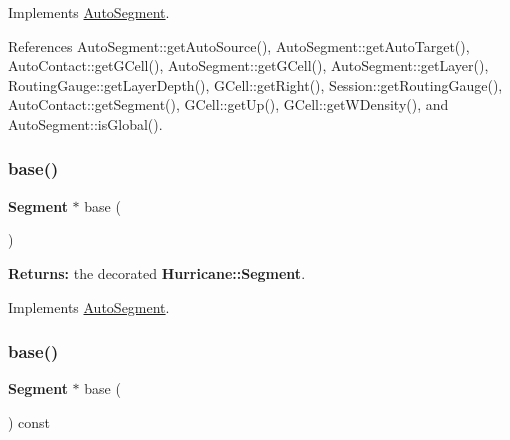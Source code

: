 Implements \hyperlink{classKatabatic_1_1AutoSegment_a096deb8a143f098eac2bff9ab9c52243}{Auto\+Segment}.



References Auto\+Segment\+::get\+Auto\+Source(), Auto\+Segment\+::get\+Auto\+Target(), Auto\+Contact\+::get\+G\+Cell(), Auto\+Segment\+::get\+G\+Cell(), Auto\+Segment\+::get\+Layer(), Routing\+Gauge\+::get\+Layer\+Depth(), G\+Cell\+::get\+Right(), Session\+::get\+Routing\+Gauge(), Auto\+Contact\+::get\+Segment(), G\+Cell\+::get\+Up(), G\+Cell\+::get\+W\+Density(), and Auto\+Segment\+::is\+Global().

\mbox{\label{classKatabatic_1_1AutoVertical_a9e651c17b47f82166a02865c9296a2df}} 
\subsubsection{\texorpdfstring{base()}{base()}\hspace{0.1cm}{\footnotesize\ttfamily [1/2]}}
{\footnotesize\ttfamily \textbf{ Segment} $\ast$ base (\begin{DoxyParamCaption}{ }\end{DoxyParamCaption})\hspace{0.3cm}{\ttfamily [virtual]}}

{\bfseries Returns\+:} the decorated \textbf{ Hurricane\+::\+Segment}. 

Implements \hyperlink{classKatabatic_1_1AutoSegment_ade416d0483aefe986988fa89a7cf6fcf}{Auto\+Segment}.

\mbox{\label{classKatabatic_1_1AutoVertical_a6f14a3faa93f2c610ea0d2cc7d903706}} 
\subsubsection{\texorpdfstring{base()}{base()}\hspace{0.1cm}{\footnotesize\ttfamily [2/2]}}
{\footnotesize\ttfamily \textbf{ Segment} $\ast$ base (\begin{DoxyParamCaption}{ }\end{DoxyParamCaption}) const\hspace{0.3cm}{\ttfamily [virtual]}}

